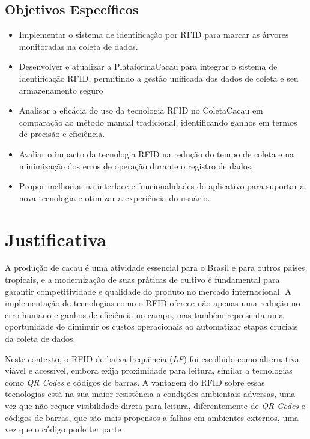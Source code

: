 \subsection{Objetivos Específicos}
\begin{itemize}
    \item Implementar o sistema de identificação por RFID para marcar as árvores monitoradas na coleta de dados.

    \item Desenvolver e atualizar a PlataformaCacau para integrar o sistema de identificação RFID, permitindo a gestão unificada dos dados de coleta e seu armazenamento seguro

    \item Analisar a eficácia do uso da tecnologia RFID no ColetaCacau em comparação ao método manual tradicional, identificando ganhos em termos de precisão e eficiência.
    
    \item Avaliar o impacto da tecnologia RFID na redução do tempo de coleta e na minimização dos erros de operação durante o registro de dados.
    
    \item Propor melhorias na interface e funcionalidades do aplicativo para suportar a nova tecnologia e otimizar a experiência do usuário.
\end{itemize}

\section{Justificativa}
A produção de cacau é uma atividade essencial para o Brasil e para outros países tropicais, e a modernização de suas práticas de cultivo é fundamental para garantir competitividade e qualidade do produto no mercado internacional. A implementação de tecnologias como o RFID oferece não apenas uma redução no erro humano e ganhos de eficiência no campo, mas também representa uma oportunidade de diminuir os custos operacionais ao automatizar etapas cruciais da coleta de dados.

Neste contexto, o RFID de baixa frequência (\textit{LF}) foi escolhido como alternativa viável e acessível, embora exija proximidade para leitura, similar a tecnologias como \textit{QR Codes} e códigos de barras. A vantagem do RFID sobre essas tecnologias está na sua maior resistência a condições ambientais adversas, uma vez que não requer visibilidade direta para leitura, diferentemente de \textit{QR Codes} e códigos de barras, que são mais propensos a falhas em ambientes externos, uma vez que o código pode ter parte 

